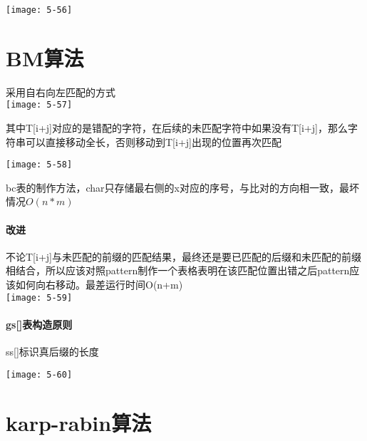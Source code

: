 \texttt{[image: 5-56]}

\section{BM算法}
采用自右向左匹配的方式\\
\texttt{[image: 5-57]}

其中T[i+j]对应的是错配的字符，在后续的未匹配字符中如果没有T[i+j]，那么字符串可以直接移动全长，否则移动到T[i+j]出现的位置再次匹配

\texttt{[image: 5-58]}

bc表的制作方法，char只存储最右侧的x对应的序号，与比对的方向相一致，最坏情况$O(n*m)$

\paragraph{改进}
不论T[i+j]与未匹配的前缀的匹配结果，最终还是要已匹配的后缀和未匹配的前缀相结合，所以应该对照pattern制作一个表格表明在该匹配位置出错之后pattern应该如何向右移动。最差运行时间O(n+m)\\
\texttt{[image: 5-59]}

\paragraph{gs[]表构造原则}
ss[]标识真后缀的长度

\texttt{[image: 5-60]}

\section{karp-rabin算法}




















